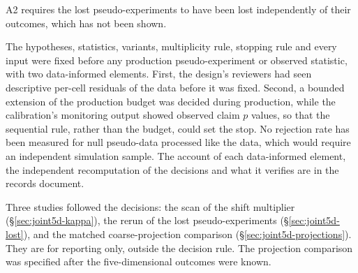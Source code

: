 A2 requires the lost pseudo-experiments to have been lost independently of their outcomes, which has not been shown.

The hypotheses, statistics, variants, multiplicity rule, stopping rule and every input were fixed before any production pseudo-experiment or observed statistic, with two data-informed elements. First, the design's reviewers had seen descriptive per-cell residuals of the data before it was fixed. Second, a bounded extension of the production budget was decided during production, while the calibration's monitoring output showed observed claim $p$ values, so that the sequential rule, rather than the budget, could set the stop. No rejection rate has been measured for null pseudo-data processed like the data, which would require an independent simulation sample. The account of each data-informed element, the independent recomputation of the decisions and what it verifies are in the records document.

Three studies followed the decisions: the scan of the shift multiplier (\S\ref{sec:joint5d-kappa}), the rerun of the lost pseudo-experiments (\S\ref{sec:joint5d-lost}), and the matched coarse-projection comparison (\S\ref{sec:joint5d-projections}). They are for reporting only, outside the decision rule. The projection comparison was specified after the five-dimensional outcomes were known.

